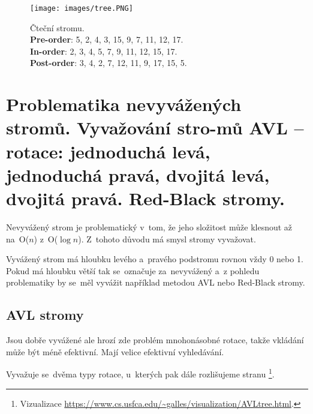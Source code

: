 \begin{figure}[ht]
	\centering
	\texttt{[image: images/tree.PNG]}
	\caption{
		Čteční stromu. \\
		\textbf{Pre-order}: 5, 2, 4, 3, 15, 9, 7, 11, 12, 17. \\
		\textbf{In-order}: 2, 3, 4, 5, 7, 9, 11, 12, 15, 17. \\
		\textbf{Post-order}: 3, 4, 2, 7, 12, 11, 9, 17, 15, 5. \\
	}
	\label{tree}
\end{figure}

\clearpage
\section[Problematika nevyvážených stromů. Vyvažování stromů AVL - rotace: jednoduchá levá, jednoduchá pravá, dvojitá levá, dvojitá pravá. Red-Black stromy]{Problematika nevyvážených stromů. Vyvažování stro-mů AVL -- rotace: jednoduchá levá, jednoduchá pravá, dvojitá levá, dvojitá pravá. Red-Black stromy.
}

Nevyvážený strom je problematický v~tom, že jeho složitost může klesnout až na~O($n$) z~O($\log{n}$). Z~tohoto důvodu má smysl stromy vyvažovat.

Vyvážený strom má hloubku levého a~pravého podstromu rovnou vždy 0 nebo 1. Pokud má hloubku větší tak se~označuje za~nevyvážený a~z pohledu problematiky by se~měl vyvážit například metodou AVL nebo Red-Black stromy.

\subsection{AVL stromy}

Jsou dobře vyvážené ale hrozí zde problém mnohonásobné rotace, takže vkládání může být méně efektivní. Mají velice efektivní vyhledávání.

Vyvažuje se~dvěma typy rotace, u~kterých pak dále rozlišujeme stranu%
\footnote{Vizualizace \url{https://www.cs.usfca.edu/~galles/visualization/AVLtree.html}.}.

